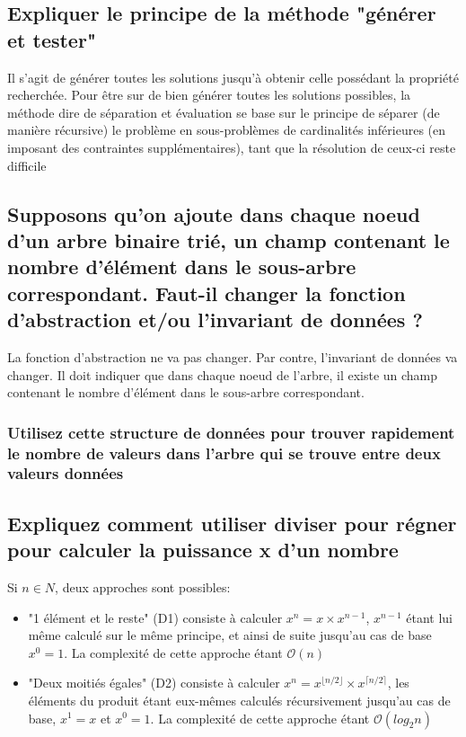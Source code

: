 \documentclass[11pt]{article}
\begin{document}
\subsection{Expliquer le principe de la méthode "générer et tester"}

Il s’agit de générer toutes les solutions jusqu’à obtenir celle possédant la propriété recherchée. Pour être sur de bien générer toutes les solutions possibles, la méthode dire de séparation et évaluation se base sur le principe de séparer (de manière récursive) le problème en sous-problèmes de cardinalités inférieures (en imposant des contraintes supplémentaires), tant que la résolution de ceux-ci reste difficile

\subsection{Supposons qu'on ajoute dans chaque noeud d'un arbre binaire trié, un champ contenant le nombre d'élément dans le sous-arbre correspondant. Faut-il changer la fonction d'abstraction et/ou l'invariant de données ?}

La fonction d'abstraction ne va pas changer. Par contre, l'invariant de données va changer. Il doit indiquer que dans chaque noeud de l'arbre, il existe un champ contenant le nombre d'élément dans le sous-arbre correspondant.

\subsubsection{Utilisez cette structure de données pour trouver rapidement le nombre de valeurs dans l'arbre qui se trouve entre deux valeurs données}

\subsection{Expliquez comment utiliser diviser pour régner pour calculer la puissance x d'un nombre}

Si $n \in N$, deux approches sont possibles:

\begin{itemize}
	\item "1 élément et le reste" (D1) consiste à calculer $x^n = x \times x^{n-1}$, $x^{n-1}$ étant lui même calculé sur le même principe, et ainsi de suite jusqu'au cas de base $x^0 = 1$. La complexité de cette approche étant $\mathcal{O}(n)$
	\item "Deux moitiés égales" (D2) consiste à calculer $x^n = x^{\lfloor n/2\rfloor} \times x^{\lceil n/2 \rceil}$, les éléments du produit étant eux-mêmes calculés récursivement jusqu'au cas de base, $x^1 = x$ et $x^0 = 1$. La complexité de cette approche étant $\mathcal{O}(log_2{n})$
\end{itemize}
\end{document}
